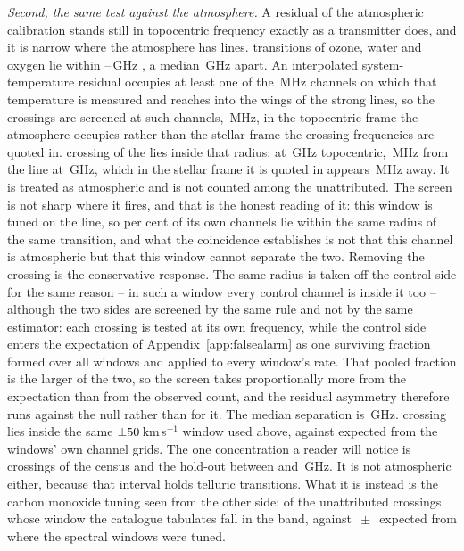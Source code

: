 \emph{Second, the same test against the atmosphere.} A residual of the
atmospheric calibration stands still in topocentric frequency exactly as a
transmitter does, and it is narrow where the atmosphere has lines.
\TlNLine{} transitions of ozone, water and oxygen lie within
\TlFreqLo--\TlFreqHi\,GHz \citep{Pickett1998}, a median \TlSpacing\,GHz
apart. An interpolated system-temperature residual occupies at least one of
the \CdSpecTsysRes\,MHz channels on which that temperature is measured and reaches
into the wings of the strong lines, so the crossings are screened at
\ScNTsysChan{} such channels, \ScRadMHz\,MHz, in the topocentric frame the
atmosphere occupies rather than the stellar frame the crossing frequencies are
quoted in. \ScNInRad{} crossing of the \TlNCross{} lies inside that radius:
\ScNearStar{} at \ScNearFTopo\,GHz topocentric, \ScNearOffMHz\,MHz from the
\ScNearSpecies{} line at \ScNearLine\,GHz, which in the stellar frame it is
quoted in appears \ScNearOffStarMHz\,MHz away. It is treated as atmospheric
and is not counted among the unattributed. The screen is not sharp where it
fires, and that is the honest reading of it: this window is tuned on the
line, so \ScNearWinPct{} per cent of its own channels lie within the same
radius of the same transition, and what the coincidence establishes is not
that this channel is atmospheric but that this window cannot separate the
two. Removing the crossing is the conservative response. The same radius is
taken off the control side for the same reason -- in such a window every
control channel is inside it too -- although the two sides are screened by
the same rule and not by the same estimator: each crossing is tested at its
own frequency, while the control side enters the expectation of
Appendix~\ref{app:falsealarm} as one surviving fraction formed over all
windows and applied to every window's rate. That pooled fraction is the
larger of the two, so the screen takes proportionally more from the
expectation than from the observed count, and the residual asymmetry
therefore runs against the null rather than for it. The median separation is
\TlOffMed\,GHz. \TlTubeObs{} crossing lies inside the
same $\pm50$\,km\,s$^{-1}$ window used above, against
\TlTubeNull{} expected from the windows' own channel grids. The one
concentration a reader will notice is \TlBandAll{} crossings of the census
and the hold-out between \TlBandLo{} and \TlBandHi\,GHz. It is not
atmospheric either, because that interval holds \TlBandNLine{} telluric
transitions. What it is instead is the carbon monoxide tuning seen from the
other side: \TlBandObs{} of the \TlBandNSub{} unattributed crossings whose
window the catalogue tabulates fall in the band, against
\TlBandNull$\,\pm\,$\TlBandNullSd{} expected from where the spectral windows
were tuned.

